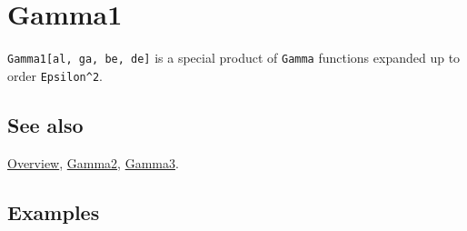 \documentclass[../FeynCalcManual.tex]{subfiles}
\begin{document}
\hypertarget{gamma1}{
\section{Gamma1}\label{gamma1}}

\texttt{Gamma1[\allowbreak{}al,\ \allowbreak{}ga,\ \allowbreak{}be,\ \allowbreak{}de]}
is a special product of \texttt{Gamma} functions expanded up to order
\texttt{Epsilon^2}.

\subsection{See also}

\hyperlink{toc}{Overview}, \hyperlink{gamma2}{Gamma2},
\hyperlink{gamma3}{Gamma3}.

\subsection{Examples}
\end{document}
